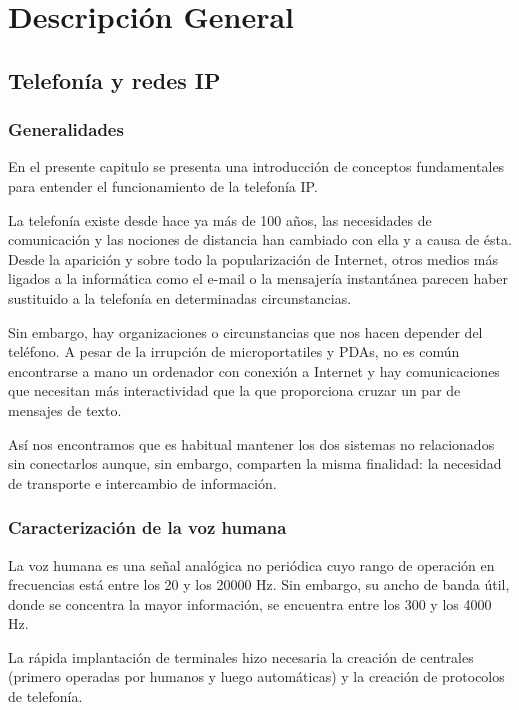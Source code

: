 \chapter{Descripción General}

\section{Telefonía y redes IP}

\subsection{Generalidades}
\label{sec:generalidades}


En el presente capitulo se presenta una introducción de conceptos fundamentales para entender el funcionamiento de la telefonía IP.


La telefonía existe desde hace ya más de 100 años, las necesidades de comunicación y las nociones de distancia han cambiado con ella y a causa de ésta. Desde la aparición y sobre todo la popularización de Internet, otros medios más ligados a la informática como el e-mail o la mensajería instantánea parecen haber sustituido a la telefonía en determinadas circunstancias.


Sin embargo, hay organizaciones o circunstancias que nos hacen depender del teléfono. A pesar de la irrupción de microportatiles y PDAs, no es común encontrarse a mano un ordenador con conexión a Internet y hay comunicaciones que necesitan más interactividad que la que proporciona cruzar un par de mensajes de texto.

Así nos encontramos que es habitual mantener los dos sistemas no relacionados sin conectarlos aunque, sin embargo, comparten la misma finalidad: la necesidad de transporte e intercambio de información.


\subsection{Caracterización de la voz humana}

La voz humana es una señal analógica no periódica cuyo rango de operación en frecuencias está entre los 20 y los 20000 Hz. Sin embargo, su ancho de banda útil, donde se concentra la mayor información, se encuentra entre los 300 y los 4000 Hz.

La rápida implantación de terminales hizo necesaria la creación de centrales (primero operadas por humanos y luego automáticas) y la creación de protocolos de telefonía.

